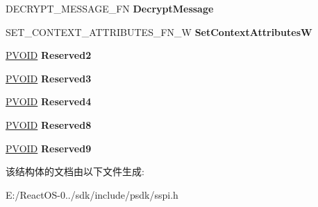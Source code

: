 \begin{DoxyCompactItemize}
\mbox{\label{struct___s_e_c_u_r_i_t_y___f_u_n_c_t_i_o_n___t_a_b_l_e___w_aa1124a0a8a912f62b4bcb1948c9af0b1}} 
D\+E\+C\+R\+Y\+P\+T\+\_\+\+M\+E\+S\+S\+A\+G\+E\+\_\+\+FN {\bfseries Decrypt\+Message}
\item 
\mbox{\label{struct___s_e_c_u_r_i_t_y___f_u_n_c_t_i_o_n___t_a_b_l_e___w_a9d05f1e9ca3f6a1127c11dcf8b9fb6a1}} 
S\+E\+T\+\_\+\+C\+O\+N\+T\+E\+X\+T\+\_\+\+A\+T\+T\+R\+I\+B\+U\+T\+E\+S\+\_\+\+F\+N\+\_\+W {\bfseries Set\+Context\+AttributesW}
\item 
\mbox{\label{struct___s_e_c_u_r_i_t_y___f_u_n_c_t_i_o_n___t_a_b_l_e___w_a9a94d82fe7ec7b373fb7b333d3907904}} 
\hyperlink{interfacevoid}{P\+V\+O\+ID} {\bfseries Reserved2}
\item 
\mbox{\label{struct___s_e_c_u_r_i_t_y___f_u_n_c_t_i_o_n___t_a_b_l_e___w_ac0a3494c733baa8600c8ac79a8cd343d}} 
\hyperlink{interfacevoid}{P\+V\+O\+ID} {\bfseries Reserved3}
\item 
\mbox{\label{struct___s_e_c_u_r_i_t_y___f_u_n_c_t_i_o_n___t_a_b_l_e___w_a53bc057042394795c277973f7e4bfd85}} 
\hyperlink{interfacevoid}{P\+V\+O\+ID} {\bfseries Reserved4}
\item 
\mbox{\label{struct___s_e_c_u_r_i_t_y___f_u_n_c_t_i_o_n___t_a_b_l_e___w_aa7428c3f62782a4cb6572b9dc63493e2}} 
\hyperlink{interfacevoid}{P\+V\+O\+ID} {\bfseries Reserved8}
\item 
\mbox{\label{struct___s_e_c_u_r_i_t_y___f_u_n_c_t_i_o_n___t_a_b_l_e___w_af02992aec0aeef0a63fb965c7d7ec9bf}} 
\hyperlink{interfacevoid}{P\+V\+O\+ID} {\bfseries Reserved9}
\end{DoxyCompactItemize}


该结构体的文档由以下文件生成\+:\begin{DoxyCompactItemize}
\item 
E\+:/\+React\+O\+S-\/0../sdk/include/psdk/sspi.\+h\end{DoxyCompactItemize}
